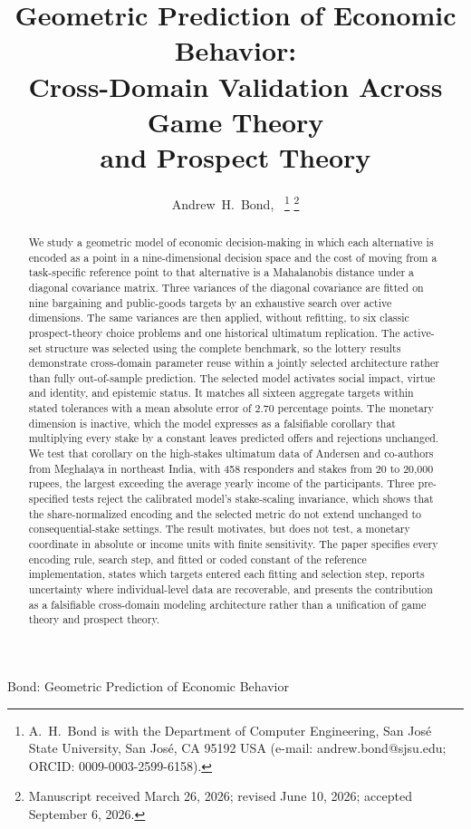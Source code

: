 \documentclass[journal]{IEEEtran}
\begin{document}
\title{Geometric Prediction of Economic Behavior:\\Cross-Domain Validation Across Game Theory\\and Prospect Theory}

\author{Andrew~H.~Bond,~%
\thanks{A.~H.~Bond is with the Department of Computer Engineering, San Jos\'{e} State University, San Jos\'{e}, CA 95192 USA (e-mail: andrew.bond@sjsu.edu; ORCID: 0009-0003-2599-6158).}%
\thanks{Manuscript received March 26, 2026; revised June 10, 2026; accepted September 6, 2026.}}

%
{Bond: Geometric Prediction of Economic Behavior}

\maketitle

\begin{abstract}
We study a geometric model of economic decision-making in which each alternative is encoded as a point in a nine-dimensional decision space and the cost of moving from a task-specific reference point to that alternative is a Mahalanobis distance under a diagonal covariance matrix.
Three variances of the diagonal covariance are fitted on nine bargaining and public-goods targets by an exhaustive search over active dimensions.
The same variances are then applied, without refitting, to six classic prospect-theory choice problems and one historical ultimatum replication.
The active-set structure was selected using the complete benchmark, so the lottery results demonstrate cross-domain parameter reuse within a jointly selected architecture rather than fully out-of-sample prediction.
The selected model activates social impact, virtue and identity, and epistemic status.
It matches all sixteen aggregate targets within stated tolerances with a mean absolute error of 2.70 percentage points.
The monetary dimension is inactive, which the model expresses as a falsifiable corollary that multiplying every stake by a constant leaves predicted offers and rejections unchanged.
We test that corollary on the high-stakes ultimatum data of Andersen and co-authors from Meghalaya in northeast India, with 458 responders and stakes from 20 to 20,000 rupees, the largest exceeding the average yearly income of the participants.
Three pre-specified tests reject the calibrated model's stake-scaling invariance, which shows that the share-normalized encoding and the selected metric do not extend unchanged to consequential-stake settings.
The result motivates, but does not test, a monetary coordinate in absolute or income units with finite sensitivity.
The paper specifies every encoding rule, search step, and fitted or coded constant of the reference implementation, states which targets entered each fitting and selection step, reports uncertainty where individual-level data are recoverable, and presents the contribution as a falsifiable cross-domain modeling architecture rather than a unification of game theory and prospect theory.
\end{abstract}
\end{document}
